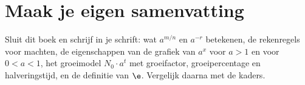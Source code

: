 \begin{oefeningen}


\end{oefeningen}


\begin{oefeningen}






\end{oefeningen}


\ifzelfstudie
\section*{Maak je eigen samenvatting}
Sluit dit boek en schrijf in je schrift: wat $a^{m/n}$ en $a^{-r}$ betekenen, de rekenregels voor machten, de eigenschappen van de grafiek van $a^x$ voor $a > 1$ en voor $0 < a < 1$, het groeimodel $N_0 \cdot a^t$ met groeifactor, groeipercentage en halveringstijd, en de definitie van $\e$. Vergelijk daarna met de kaders.
\fi
